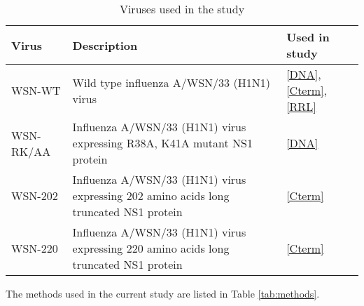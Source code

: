 	\begin{table}[h!] 
	\caption{Viruses used in the study} \label{tab:viruses}
		\begin{tabu} to \linewidth {X[1.8,l] X[5.9,l] X[2,c]}
		\hline \textbf{Virus} & \textbf{Description} & \textbf{Used in study} \\ 
		\hline WSN-WT & Wild type influenza A/WSN/33 (H1N1) virus & \ref*{DNA}, \ref*{Cterm}, \ref*{RRL} \\ 
		\hline WSN-RK/AA & Influenza A/WSN/33 (H1N1) virus expressing R38A, K41A mutant NS1 protein & \ref*{DNA} \\
		\hline WSN-202 & Influenza A/WSN/33 (H1N1) virus expressing 202 amino acids long truncated NS1 protein & \ref*{Cterm} \\
		\hline WSN-220 & Influenza A/WSN/33 (H1N1) virus expressing 220 amino acids long truncated NS1 protein & \ref*{Cterm} \\
		\hline 
		\end{tabu}
	\end{table}

The methods used in the current study are listed in Table \ref{tab:methods}.

